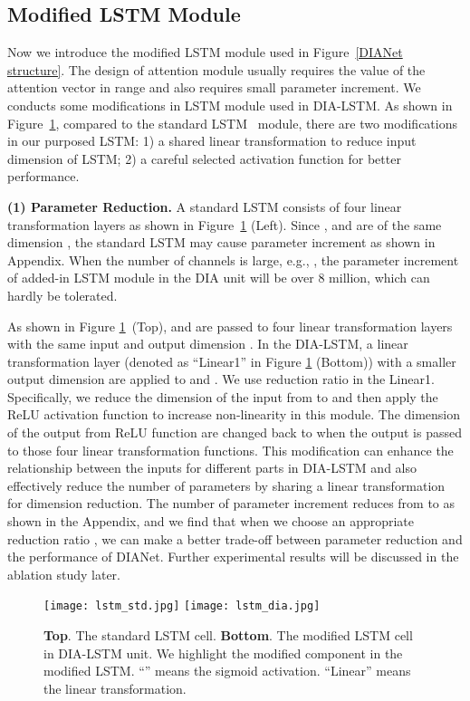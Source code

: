 \documentclass[letterpaper]{article} \usepackage{aaai20}  \usepackage{times}  \usepackage{helvet} \usepackage{courier}  \usepackage[hyphens]{url}  \usepackage{graphicx} \urlstyle{rm} \def\UrlFont{\rm}  \usepackage{graphicx}  \frenchspacing  \setlength{\pdfpagewidth}{8.5in}  \setlength{\pdfpageheight}{11in}  \usepackage{color}
\begin{document}
	\subsection{Modified LSTM Module}
	\label{sec:lstm}
	Now we introduce the modified LSTM module used in Figure~\ref{DIANet structure}. The design of attention module usually requires the value of the attention vector in range  and also requires small parameter increment. We conducts some modifications in LSTM module used in DIA-LSTM. As shown in Figure~\ref{LSTM compare}, compared to the standard LSTM~\cite{hochreiter1997long} module, there are two modifications in our purposed LSTM: 1) a shared linear transformation to reduce input dimension of LSTM; 2) a careful selected activation function for better performance. 
	
	\noindent\textbf{(1) Parameter Reduction.} A standard LSTM consists of four linear transformation layers as shown in Figure~\ref{LSTM compare} (Left). Since ,  and  are of the same dimension , the standard LSTM may cause  parameter increment as shown in Appendix. When the number of channels is large, e.g., , the parameter increment of added-in LSTM module in the DIA unit will be over 8 million, which can hardly be tolerated. 
	
	As shown in Figure \ref{LSTM compare}~(Top),  and  are passed to four linear transformation layers with the same input and output dimension . In the DIA-LSTM, a linear transformation layer (denoted as ``Linear1'' in Figure \ref{LSTM compare} (Bottom)) with a smaller output dimension are applied to  and . We use reduction ratio  in the Linear1. Specifically, we reduce the dimension of the input  from  to  and then apply the ReLU activation function to increase non-linearity in this module. The dimension of the output from ReLU function are changed back to  when the output is passed to those four linear transformation functions. This modification can enhance the relationship between the inputs for different parts in DIA-LSTM and also effectively reduce the number of parameters by sharing a linear transformation for dimension reduction. The number of parameter increment reduces from  to  as shown in the Appendix, and we find that when we choose an appropriate reduction ratio , we can make a better trade-off between parameter reduction and the performance of DIANet. Further experimental results will be discussed in the ablation study later.
		

	\begin{figure}[h]
		\centering
		\texttt{[image: lstm\_std.jpg]}
		\hspace{.5in}
		\texttt{[image: lstm\_dia.jpg]}
		\caption{\textbf{Top}. The standard LSTM cell. \textbf{Bottom}. The modified LSTM cell in DIA-LSTM unit. We highlight the modified component in the modified LSTM. ``'' means the sigmoid activation. ``Linear'' means the linear transformation.
		}
		\label{LSTM compare}
	\end{figure}
\end{document}
